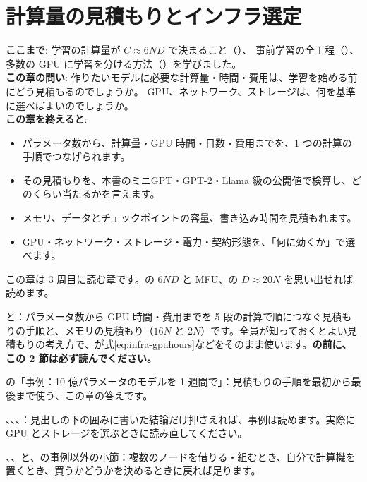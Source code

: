 \chapter{計算量の見積もりとインフラ選定}\label{ch:infra}

\begin{chapterlead}
\textbf{ここまで}: 学習の計算量が $C\approx 6ND$ で決まること（）、
事前学習の全工程（）、多数の GPU に学習を分ける方法（）を学びました。\\[1mm]
\textbf{この章の問い}: 作りたいモデルに必要な計算量・時間・費用は、学習を始める前にどう見積もるのでしょうか。
GPU、ネットワーク、ストレージは、何を基準に選べばよいのでしょうか。\\[1mm]
\textbf{この章を終えると}:
\begin{itemize}
\item パラメータ数から、計算量・GPU 時間・日数・費用までを、1 つの計算の手順でつなげられます。
\item その見積もりを、本書のミニGPT・GPT-2・Llama 級の公開値で検算し、どのくらい当たるかを言えます。
\item メモリ、データとチェックポイントの容量、書き込み時間を見積もれます。
\item GPU・ネットワーク・ストレージ・電力・契約形態を、「何に効くか」で選べます。
\end{itemize}
\end{chapterlead}

\begin{readingguide}
\item[\rgpre] この章は 3 周目に読む章です。の $6ND$ と MFU、の $D\approx20N$ を思い出せれば読めます。
\item[\rgmust] と：パラメータ数から GPU 時間・費用までを 5 段の計算で順につなぐ見積もりの手順と、メモリの見積もり（$16N$ と $2N$）です。全員が知っておくとよい見積もりの考え方で、が式\eqref{eq:infra-gpuhours}などをそのまま使います。\textbf{の前に、この 2 節は必ず読んでください。}
\item[\rgmust] の「事例：10 億パラメータのモデルを 1 週間で」：見積もりの手順を最初から最後まで使う、この章の答えです。
\item[\rgskim] 、、、：見出しの下の囲みに書いた結論だけ押さえれば、事例は読めます。実際に GPU とストレージを選ぶときに読み直してください。
\item[\rglater] 、、と、の事例以外の小節：複数のノードを借りる・組むとき、自分で計算機を置くとき、買うかどうかを決めるときに戻れば足ります。
\end{readingguide}

